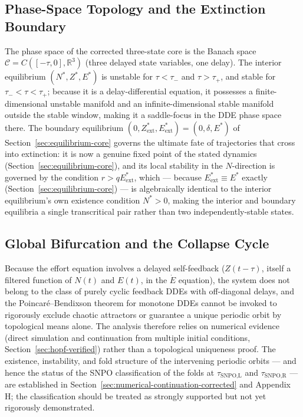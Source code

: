 \documentclass[twocolumn,10pt]{article}
\begin{document}
\subsection{Phase-Space Topology and the Extinction Boundary}
The phase space of the corrected three-state core is the Banach space \(\mathcal{C} = C([-\tau, 0], \mathbb{R}^3)\) (three delayed state variables, one delay). The interior equilibrium \((N^*,Z^*,E^*)\) is unstable for \(\tau < \tau_{-}\) and \(\tau > \tau_{+}\), and stable for \(\tau_{-} < \tau < \tau_{+}\); because it is a delay-differential equation, it possesses a finite-dimensional unstable manifold and an infinite-dimensional stable manifold outside the stable window, making it a saddle-focus in the DDE phase space there. The boundary equilibrium $(0,Z^*_{\text{ext}},E^*_{\text{ext}})=(0,\delta,E^*)$ of Section~\ref{sec:equilibrium-core} governs the ultimate fate of trajectories that cross into extinction: it is now a genuine fixed point of the stated dynamics (Section~\ref{sec:equilibrium-core}), and its local stability in the $N$-direction is governed by the condition $r>qE^*_{\text{ext}}$, which — because $E^*_{\text{ext}}\equiv E^*$ exactly (Section~\ref{sec:equilibrium-core}) — is algebraically identical to the interior equilibrium's own existence condition $N^*>0$, making the interior and boundary equilibria a single transcritical pair rather than two independently-stable states.

\subsection{Global Bifurcation and the Collapse Cycle}
Because the effort equation involves a delayed self-feedback (\(Z(t-\tau)\), itself a filtered function of $N(t)$ and $E(t)$, in the \(\dot{E}\) equation), the system does not belong to the class of purely cyclic feedback DDEs with off-diagonal delays, and the Poincar\'e--Bendixson theorem for monotone DDEs \cite{mallet1996,smith1995} cannot be invoked to rigorously exclude chaotic attractors or guarantee a unique periodic orbit by topological means alone. The analysis therefore relies on numerical evidence (direct simulation and continuation from multiple initial conditions, Section~\ref{sec:hopf-verified}) rather than a topological uniqueness proof. The existence, instability, and fold structure of the intervening periodic orbits --- and hence the status of the SNPO classification of the folds at $\tau_{\text{SNPO,L}}$ and $\tau_{\text{SNPO,R}}$ --- are established in Section~\ref{sec:numerical-continuation-corrected} and Appendix H; the classification should be treated as strongly supported but not yet rigorously demonstrated.
\end{document}
